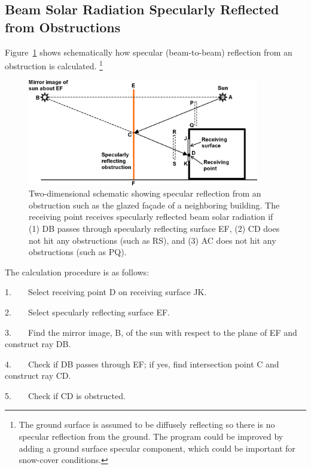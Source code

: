\subsection{Beam Solar Radiation Specularly Reflected from Obstructions}\label{beam-solar-radiation-specularly-reflected-from-obstructions}

Figure~\ref{fig:two-dimensional-schematic-showing-specular} shows schematically how specular (beam-to-beam) reflection from an obstruction is calculated. \footnote{The ground surface is assumed to be diffusely reflecting so there is no specular reflection from the ground. The program could be improved by adding a ground surface specular component, which could be important for snow-cover conditions.} 

\begin{figure}[hbtp] %
\centering
\includegraphics[width=0.9\textwidth, height=0.9\textheight, keepaspectratio=true]{media/image703.png}
\caption{Two-dimensional schematic showing specular reflection from an obstruction such as the glazed façade of a neighboring building. The receiving point receives specularly reflected beam solar radiation if (1) DB passes through specularly reflecting surface EF, (2) CD does not hit any obstructions (such as RS), and (3) AC does not hit any obstructions (such as PQ). \protect \label{fig:two-dimensional-schematic-showing-specular}}
\end{figure}

The calculation procedure is as follows:

1.~~~~Select receiving point D on receiving surface JK.

2.~~~~Select specularly reflecting surface EF.

3.~~~~Find the mirror image, B, of the sun with respect to the plane of EF and construct ray DB.

4.~~~~Check if DB passes through EF; if yes, find intersection point C and construct ray CD.

5.~~~~Check if CD is obstructed.

